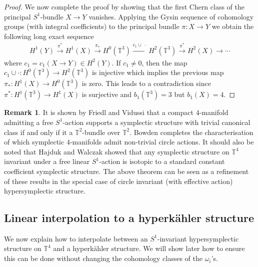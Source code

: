 \documentclass[11pt]{amsart}
\theoremstyle{plain}
\theoremstyle{definition}
\newtheorem{remark}[theorem]{Remark}
\theoremstyle{plain}
\theoremstyle{definition}
\numberwithin{equation}{section}
\numberwithin{theorem}{section}
\begin{document}
\begin{proof}
We now complete the proof by showing that the first Chern class of the principal $S^1$-bundle $X \to Y$ vanishes. Applying the Gysin sequence of cohomology groups (with integral coefficients) to the principal bundle $\pi \colon X \to Y$ we obtain the following long exact sequence
    \begin{align}
    \label{Gysin-sequence}
      H^1(Y)\xrightarrow{\pi^*} H^1(X) \xrightarrow{\pi_*} H^0(\mathbb{T}^3)\xrightarrow{c_1\cup~\cdot} H^2(\mathbb{T}^3) \xrightarrow{\pi^*} H^2(X)\rightarrow \cdots
    \end{align}
   where $c_1=c_1(X \to Y)\in H^2(Y)$. If $c_1\neq 0$, then the map $c_1\cup\cdot: H^0(\mathbb{T}^3)\xrightarrow{} H^2(\mathbb{T}^3)$ is injective which implies the previous map $\pi_*: H^1(X)\xrightarrow{} H^0(\mathbb{T}^3)$ is zero. This leads to a contradiction since $\pi^*: H^1(\mathbb{T}^3)\to H^1\left(X \right)$ is surjective and $b_1(\mathbb{T}^3)=3$ but $b_1(X)=4$. 
  \end{proof}

  \begin{remark}
      It is shown by Friedl and Vidussi \cite[Theorem 3]{FV} that a compact $4$-manifold admitting a free $S^1$-action supports a symplectic structure with trivial canonical class if and only if it a $\mathbb{T}^2$-bundle over $\mathbb{T}^2$. Bowden \cite{B} completes the characterisation of which symplectic $4$-manifolds admit non-trivial circle actions. It should also be noted that Hajduk and Walczak \cite[Corollary 2.1]{HW} showed that any symplectic structure on $\mathbb{T}^4$ invariant under a free linear $S^1$-action is isotopic to a standard constant coefficient symplectic structure. The above theorem can be seen as a refinement of these results in the special case of circle invariant (with effective action) hypersymplectic structure. 
  \end{remark}
    
\subsection{Linear interpolation to a hyperk\"ahler structure}

We now explain how to interpolate between an $S^1$-invariant hypersymplectic structure on $\mathbb{T}^4$ and a hyperk\"ahler structure. We will show later how to ensure this can be done without changing the cohomology classes of the $\omega_i$'s. 
\end{document}
